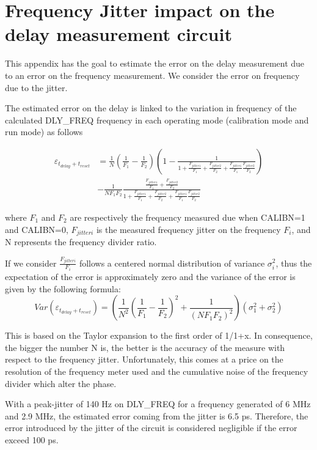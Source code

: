 
\chapter{Frequency Jitter impact on the delay measurement circuit}
\label{app:delay_circuit_jitter}
This appendix has the goal to estimate the error on the delay measurement due to an error on the frequency measurement. We consider the error on frequency due to the jitter.

The estimated error on the delay is linked to the variation in frequency of the calculated DLY\_FREQ frequency in each operating mode (calibration mode and run mode) as follows

\begin{align}
\varepsilon_{t_{delay}+t_{reset}} &= \frac{1}{N} \left(\frac{1}{F_1}-\frac{1}{F_2} \right) \left(1 - \frac{1}{1+\frac{F_{jitter1}}{F_1}+\frac{F_{jitter2}}{F_2}+\frac{F_{jitter1}}{F_1}\frac{F_{jitter2}}{F_2}} \right) \\
&- \frac{1}{NF_1 F_2} \frac{\frac{F_{jitter1}}{F_1}+\frac{F_{jitter2}}{F_2}}{1+\frac{F_{jitter1}}{F_1}+\frac{F_{jitter2}}{F_2}+\frac{F_{jitter1}}{F_1}\frac{F_{jitter2}}{F_2}} \nonumber
\end{align}

where $F_1$ and $F_2$ are respectively the frequency measured due when CALIBN=1 and CALIBN=0, $F_{jitteri}$ is the measured frequency jitter on the frequency $F_i$, and N represents the frequency divider ratio.

If we consider $\frac{F_{jitteri}}{F_i}$ follows a centered normal distribution of variance $\sigma_i^2$, thus the expectation of the error is approximately zero and the variance of the error is given by the following formula:
\begin{equation}
Var\left(\varepsilon_{t_{delay}+t_{reset}}\right) = \left(\frac{1}{N^2} \left(\frac{1}{F_1}-\frac{1}{F_2} \right)^2 + \frac{1}{\left(NF_1F_2\right)^2} \right) \left(\sigma_1^2+\sigma_2^2 \right)
\end{equation}

This is based on the Taylor expansion to the first order of 1/1+x. In consequence, the bigger the number N is, the better is the accuracy of the measure with respect to the frequency jitter. Unfortunately, this comes at a price on the resolution of the frequency meter used and the cumulative noise of the frequency divider which alter the phase.

With a peak-jitter of 140 Hz on DLY\_FREQ for a frequency generated of 6 MHz and 2.9 MHz, the estimated error coming from the jitter is 6.5 ps. Therefore, the error introduced by the jitter of the circuit is considered negligible if the error exceed 100 ps.
